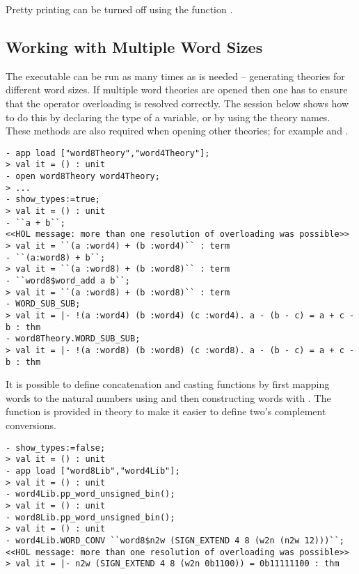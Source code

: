 \noindent Pretty printing can be turned off using the function .

\subsection{Working with Multiple Word Sizes} \label{multiple}

The executable  can be run as many times as is needed -- generating theories for different word sizes.  If multiple word theories are opened then one has to ensure that the operator overloading is resolved correctly.  The session below shows how to do this by declaring the type of a variable, or by using the theory names.  These methods are also required when opening other theories; for example  and .
\setcounter{sessioncount}{0}
\begin{session}\begin{verbatim}
- app load ["word8Theory","word4Theory"];
> val it = () : unit
- open word8Theory word4Theory;
> ...
- show_types:=true;
> val it = () : unit
- ``a + b``;
<<HOL message: more than one resolution of overloading was possible>>
> val it = ``(a :word4) + (b :word4)`` : term
- ``(a:word8) + b``;
> val it = ``(a :word8) + (b :word8)`` : term
- ``word8$word_add a b``;
> val it = ``(a :word8) + (b :word8)`` : term
- WORD_SUB_SUB;
> val it = |- !(a :word4) (b :word4) (c :word4). a - (b - c) = a + c - b : thm
- word8Theory.WORD_SUB_SUB;
> val it = |- !(a :word8) (b :word8) (c :word8). a - (b - c) = a + c - b : thm
\end{verbatim}\end{session}

It is possible to define concatenation and casting functions by first mapping words to the natural numbers using  and then constructing words with .  The function  is provided in  theory to make it easier to define two's complement conversions.
\begin{session}\begin{verbatim}
- show_types:=false;
> val it = () : unit
- app load ["word8Lib","word4Lib"];
> val it = () : unit
- word4Lib.pp_word_unsigned_bin();
> val it = () : unit
- word8Lib.pp_word_unsigned_bin();
> val it = () : unit
- word4Lib.WORD_CONV ``word8$n2w (SIGN_EXTEND 4 8 (w2n (n2w 12)))``;
<<HOL message: more than one resolution of overloading was possible>>
> val it = |- n2w (SIGN_EXTEND 4 8 (w2n 0b1100)) = 0b11111100 : thm
\end{verbatim}\end{session}
